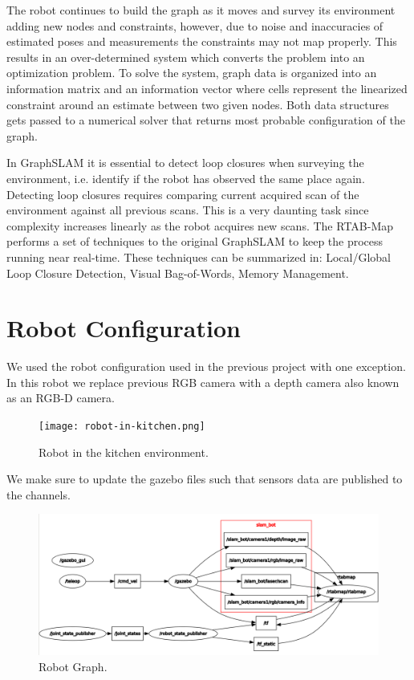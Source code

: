 \documentclass[10pt,journal,compsoc]{IEEEtran}
\begin{document}
The robot continues to build the graph as it moves and survey its environment adding new nodes and constraints, however, due to noise and inaccuracies of estimated poses and measurements the constraints may not map properly. This results in an over-determined system which converts the problem into an optimization problem. To solve the system, graph data is organized into an information matrix and an information vector where cells represent the linearized constraint around an estimate between two given nodes. Both data structures gets passed to a numerical solver that returns most probable configuration of the graph.

In GraphSLAM it is essential to detect loop closures when surveying the environment, i.e. identify if the robot has observed the same place again. Detecting loop closures requires comparing current acquired scan of the environment against all previous scans.  This is a very daunting task since complexity increases linearly as the robot acquires new scans. The RTAB-Map performs a set of techniques to the original GraphSLAM to keep the process running near real-time. These techniques can be summarized in: Local/Global Loop Closure Detection, Visual Bag-of-Words, Memory Management.

\section{Robot Configuration}
We used the robot configuration used in the previous project \cite{ros-amcl-robot-navigation} with one exception. In this robot we replace previous RGB camera with a depth camera also known as an RGB-D camera.

\begin{figure}[thpb]
      \centering
      \texttt{[image: robot-in-kitchen.png]}
      \caption{Robot in the kitchen environment.}
      \label{fig:network-training}
\end{figure}

We make sure to update the gazebo files such that sensors data are published to the channels.

\begin{figure}[thpb]
      \centering
      \includegraphics[width=\linewidth]{robot-graph.png}
      \caption{Robot Graph.}
      \label{fig:network-training}
\end{figure}
\end{document}
